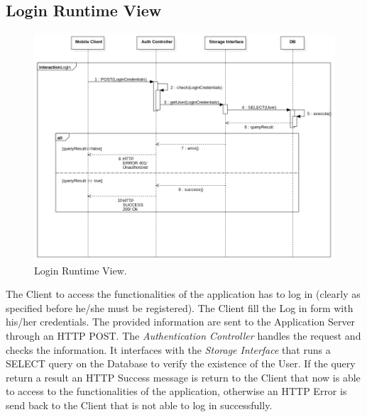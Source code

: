 \documentclass{report}
\begin{document}
\subsection{Login Runtime View}
\begin{figure}[!ht]
	\begin{center}
	\includegraphics[width=\textwidth]{img/Login.png}
    \end{center}
    \label{fig:LoginSD}
	\caption{Login Runtime View.}
\end{figure}
The Client to access the functionalities of the application has to log in (clearly as specified before he/she must be registered). The Client fill the Log in form with his/her credentials. The provided information are sent to the Application Server through an HTTP POST. The \textit{Authentication Controller} handles the request and checks the information. It interfaces with the \textit{Storage Interface} that runs a SELECT query on the Database to verify the existence of the User. If the query return a result an HTTP Success message is return to the Client that now is able to access to the functionalities of the application, otherwise an HTTP Error is send back to the Client that is not able to log in successfully.
\end{document}
